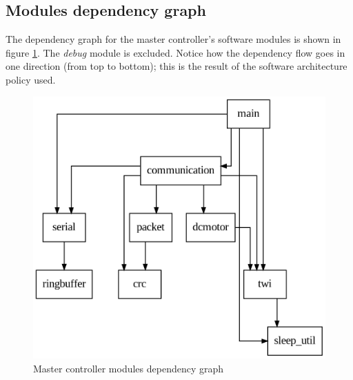 \documentclass[binding=0.6cm,Lau]{sapthesis}
\begin{document}
\subsection{Modules dependency graph}
The dependency graph for the master controller's software modules is shown in
figure \ref{img:master-deps-graph}. The \emph{debug} module is excluded. Notice
how the dependency flow goes in one direction (from top to bottom); this is the
result of the software architecture policy used.
\begin{figure}[hbp]
\begin{centering}
  \includegraphics[scale=0.5]{img/master-deps}
  \caption{Master controller modules dependency graph}
  \label{img:master-deps-graph}
\end{centering}
\end{figure}
\end{document}
